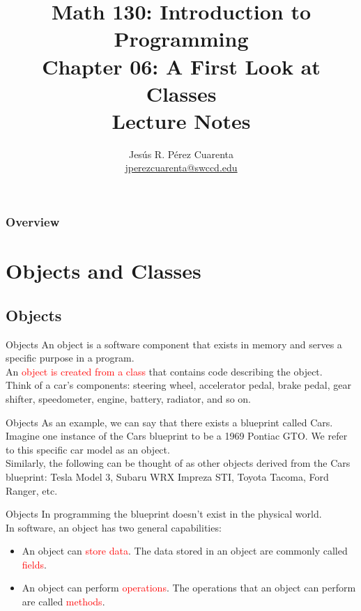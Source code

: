 \documentclass[11pt]{beamer}
\title[Chapter 06 Notes]{Math 130: Introduction to Programming \\ Chapter 06: A First Look at Classes \\ Lecture Notes}
\author{Jesús R. Pérez Cuarenta \\
\href{mailto:jperezcuarenta@swccd.edu}{jperezcuarenta@swccd.edu}
}
\date{}
\newcommand{\red}[1]{\textcolor{red}{#1}}
\begin{document}
\begin{frame}
  \maketitle
\end{frame}

\begin{frame}
\frametitle{Overview}
    \tableofcontents
\end{frame}

\section{Objects and Classes}
\subsection{Objects}
\begin{frame}{Objects}
    An object is a software component that exists in memory and serves a specific purpose in a program. \\ 
    \vspace{1em}
    An \red{object is created from a class} that contains code describing the object. \\ 
    \vspace{1em} 
    Think of a car's components: steering wheel, accelerator pedal, brake pedal, gear shifter, speedometer, engine, battery, radiator, and so on. 
\end{frame}

\begin{frame}{Objects}
    As an example, we can say that there exists a blueprint called Cars. \\
    \vspace{1em}
    Imagine one instance of the Cars blueprint to be a 1969 Pontiac GTO. We refer to this specific car model as an object. \\
    \vspace{1em}
    Similarly, the following can be thought of as other objects derived from the Cars blueprint: Tesla Model 3, Subaru WRX Impreza STI, Toyota Tacoma, Ford Ranger, etc.    
\end{frame}

\begin{frame}{Objects}
    In programming the blueprint doesn't exist in the physical world. \\ 
    \vspace{1em}
    In software, an object has two general capabilities: \\ 
    \vspace{1em}
    \begin{itemize}
        \item An object can \red{store data}. The data stored in an object are commonly called \red{fields}.
        \item An object can perform \red{operations}. The operations that an object can perform are called \red{methods}.
    \end{itemize}
\end{frame}
\end{document}

